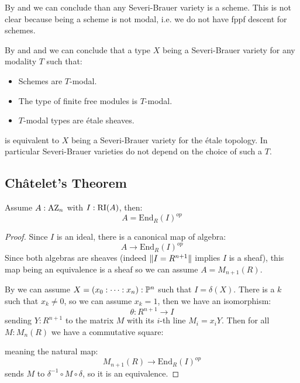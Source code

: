 \begin{remark}
By  and  we can conclude than any Severi-Brauer variety is a scheme. This is not clear because being a scheme is not modal, i.e. we do not have fppf descent for schemes.
\end{remark}

\begin{remark}\label{severi-brauer-independent-modality}
By  and  and we can conclude that a type $X$ being a Severi-Brauer variety for any modality $T$ such that:
\begin{itemize}
\item Schemes are $T$-modal.
\item The type of finite free modules is $T$-modal.
\item $T$-modal types are étale sheaves.
\end{itemize}
is equivalent to $X$ being a Severi-Brauer variety for the étale topology. In particular Severi-Brauer varieties do not depend on the choice of such a $T$.
\end{remark}


\subsection{Ch\^atelet's Theorem}

\begin{lemma}\label{azumaya-with-right-ideal}
Assume $A:\mathrm{AZ}_n$ with $I:\mathrm{RI}(A)$, then:
\[A = \mathrm{End}_R(I)^{op}\]
\end{lemma}

\begin{proof}
Since $I$ is an ideal, there is a canonical map of algebra:
\[A \to\mathrm{End}_R(I)^{op}\]
Since both algebras are sheaves (indeed $\lVert I=R^{n+1} \rVert$ implies $I$ is a sheaf), this map being an equivalence is a sheaf so we can assume $A=M_{n+1}(R)$.

By  we can assume $X=(x_0:\cdots:x_n):\mathbb{P}^n$ such that $I=\delta(X)$. There is a $k$ such that $x_k\not=0$, so we can assume $x_k=1$, then we have an isomorphism:
\[\theta:R^{n+1}\to I\]
sending $Y:R^{n+1}$ to the matrix $M$ with its $i$-th line $M_i=x_iY$. Then for all $M:M_n(R)$ we have a commutative square:
\begin{center}
\end{center}
meaning the natural map:
\[ M_{n+1}(R)\to \mathrm{End}_R(I)^{op}\]
sends $M$ to $\delta^{-1}\circ M\circ\delta$, so it is an equivalence.
\end{proof}

